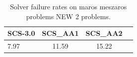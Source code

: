 \begin{table}
\centering
\caption{Solver failure rates on maros meszaros problems NEW 2 problems.}
\label{t-maros meszaros problems NEW 2-failure}
\begin{tabular}{lccc}
\toprule
 SCS-3.0 &  SCS\_AA1 &  SCS\_AA2 \\
\midrule
    7.97 &    11.59 &    15.22 \\
\bottomrule
\end{tabular}
\end{table}
